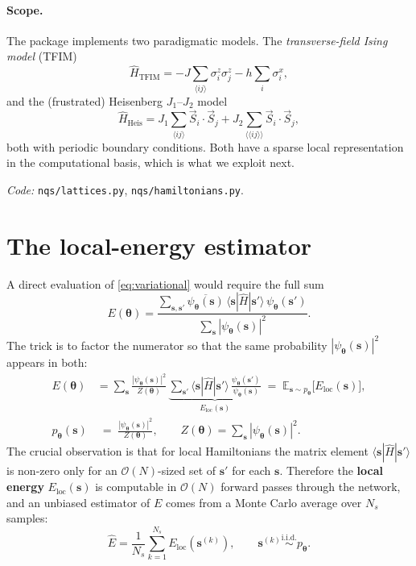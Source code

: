 \documentclass[11pt,a4paper]{article}
\newcommand{\E}{\mathbb{E}}
\newcommand{\bs}{\bm{s}}
\newcommand{\btheta}{\bm{\theta}}
\newcommand{\Hop}{\hat{H}}
\newcommand{\psip}{\psi_{\btheta}}
\newcommand{\Eloc}{E_{\mathrm{loc}}}
\theoremstyle{definition}
\theoremstyle{plain}
\begin{document}
\paragraph{Scope.}
The package implements two paradigmatic models. The \emph{transverse-field
Ising model} (TFIM)
\begin{equation}
   \Hop_{\text{TFIM}}
   = -J \sum_{\langle ij \rangle} \sigma^{z}_{i}\sigma^{z}_{j}
     - h \sum_{i} \sigma^{x}_{i},
\label{eq:TFIM}
\end{equation}
and the (frustrated) Heisenberg $J_{1}$--$J_{2}$ model
\begin{equation}
   \Hop_{\text{Heis}}
   = J_{1}\!\!\sum_{\langle ij \rangle}\! \vec{S}_{i}\cdot\vec{S}_{j}
   + J_{2}\!\!\sum_{\langle\langle ij \rangle\rangle}\! \vec{S}_{i}\cdot\vec{S}_{j},
\label{eq:HeisJ1J2}
\end{equation}
both with periodic boundary conditions. Both have a sparse local
representation in the computational basis, which is what we exploit next.

\smallskip
\noindent\textit{Code:} \texttt{nqs/lattices.py}, \texttt{nqs/hamiltonians.py}.

\section{The local-energy estimator}

A direct evaluation of \eqref{eq:variational} would require the full sum
\begin{equation}
   E(\btheta)
   = \frac{\sum_{\bs,\bs'} \overline{\psip(\bs)} \,\langle\bs|\Hop|\bs'\rangle\, \psip(\bs')}
          {\sum_{\bs} |\psip(\bs)|^{2}}.
\end{equation}
The trick is to factor the numerator so that the same probability
$|\psip(\bs)|^{2}$ appears in both:
\begin{align}
   E(\btheta)
   &= \sum_{\bs} \frac{|\psip(\bs)|^{2}}{Z(\btheta)}\,
      \underbrace{\sum_{\bs'} \langle\bs|\Hop|\bs'\rangle\,
                  \frac{\psip(\bs')}{\psip(\bs)}}_{\displaystyle \Eloc(\bs)}
   \;=\; \E_{\bs \sim p_{\btheta}}\!\bigl[\Eloc(\bs)\bigr],
\label{eq:Emean}
\\[2pt]
   p_{\btheta}(\bs)
   &\;=\; \frac{|\psip(\bs)|^{2}}{Z(\btheta)},
   \qquad
   Z(\btheta) = \sum_{\bs}|\psip(\bs)|^{2}.
\end{align}
The crucial observation is that for local Hamiltonians the matrix element
$\langle\bs|\Hop|\bs'\rangle$ is non-zero only for an
$\mathcal{O}(N)$-sized set of $\bs'$ for each $\bs$. Therefore the
\textbf{local energy} $\Eloc(\bs)$ is computable in $\mathcal{O}(N)$
forward passes through the network, and an unbiased estimator of $E$ comes
from a Monte Carlo average over $N_{s}$ samples:
\begin{equation}
   \widehat{E}
   = \frac{1}{N_{s}}\sum_{k=1}^{N_{s}} \Eloc(\bs^{(k)}),
   \qquad
   \bs^{(k)} \stackrel{\text{i.i.d.}}{\sim} p_{\btheta}.
\label{eq:Ehat}
\end{equation}
\end{document}
